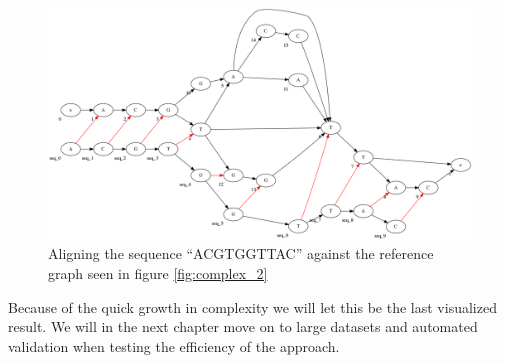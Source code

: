 \documentclass[thesis.tex]{subfiles}
\begin{document}
\begin{figure}[H]
  \begin{mdframed}
    \includegraphics[width=\textwidth]{output/complex-align.png}
  \end{mdframed}
  \caption[Aligning a sequence against \ref{fig:complex_2}]{Aligning the sequence ``ACGTGGTTAC'' against the reference graph seen in figure \ref{fig:complex_2}}
\end{figure}
\par\noindent
Because of the quick growth in complexity we will let this be the last visualized result. We will in the next chapter move on to large datasets and automated validation when testing the efficiency of the approach.
\end{document}
